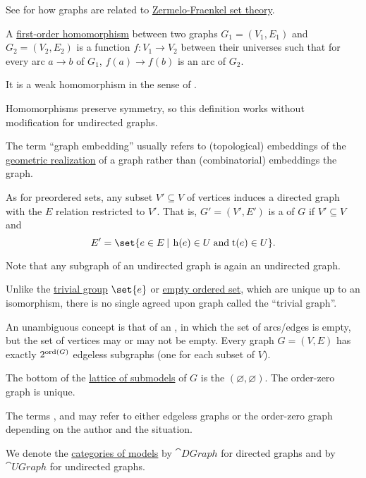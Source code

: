 \begin{definition}
\begin{thmenum}[resume=def:graph]
    See  for how graphs are related to \hyperref[def:zfc]{Zermelo-Fraenkel set theory}.

     A \hyperref[def:first_order_homomorphism]{first-order homomorphism} between two graphs \( G_1 = (V_1, E_1) \) and \( G_2 = (V_2, E_2) \) is a function \( f: V_1 \to V_2 \) between their universes such that for every arc \( a \to b \) of \( G_1 \), \( f(a) \to f(b) \) is an arc of \( G_2 \).

    It is a weak homomorphism in the sense of .

    Homomorphisms preserve symmetry, so this definition works without modification for undirected graphs.

    The term \enquote{graph embedding} usually refers to (topological) embeddings of the \hyperref[def:graph_geometric_realization]{geometric realization} of a graph rather than (combinatorial) embeddings the graph.

     As for preordered sets, any subset \( V' \subseteq V \) of vertices induces a directed graph with the \( E \) relation restricted to \( V' \). That is, \( G' = (V', E') \) is a  of \( G \) if \( V' \subseteq V \) and
    \begin{equation*}
      E' = \set{ e \in E \given \head(e) \in U \T{and} \tail(e) \in U }.
    \end{equation*}

    Note that any subgraph of an undirected graph is again an undirected graph.

     Unlike the \hyperref[def:group/trivial]{trivial group} \( \set{ e } \) or \hyperref[def:partially_ordered_set/trivial]{empty ordered set}, which are unique up to an isomorphism, there is no single agreed upon graph called the \enquote{trivial graph}.

    An unambiguous concept is that of an , in which the set of arcs/edges is empty, but the set of vertices may or may not be empty. Every graph \( G = (V, E) \) has exactly \( 2^{\operatorname{ord}(G)} \) edgeless subgraphs (one for each subset of \( V \)).

    The bottom of the \hyperref[thm:substructures_form_complete_lattice]{lattice of submodels} of \( G \) is the  \( (\varnothing, \varnothing) \). The order-zero graph is unique.

    The terms ,  and  may refer to either edgeless graphs or the order-zero graph depending on the author and the situation.

     We denote the \hyperref[def:category_of_first_order_models]{categories of models} by \( \cat{DGraph} \) for directed graphs and by \( \cat{UGraph} \) for undirected graphs.
  \end{thmenum}
\end{definition}

